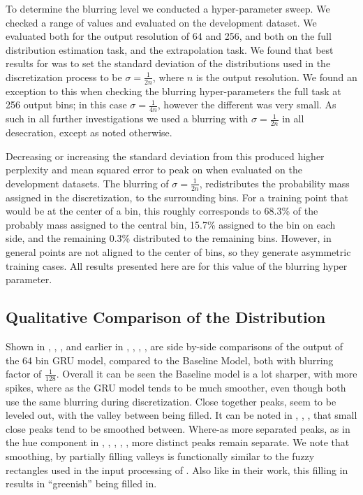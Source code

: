 \documentclass[11pt,letterpaper]{article}
\newcommand{\textcite}{\newcite}
\begin{document}
To determine the blurring level we conducted a hyper-parameter sweep.
We checked a range of values and evaluated on the development dataset.
We evaluated both for the output resolution of 64 and 256, and both on the full distribution estimation task, and the extrapolation task.
We found that best results for was to set the standard deviation of the distributions used in the discretization process to be $\sigma=\frac{1}{2n}$, where $n$ is the output resolution.
We found an exception to this when checking the blurring hyper-parameters the full task at 256 output bins; in this case $\sigma=\frac{1}{4n}$, however the different was very small.
As such in all further investigations we used a blurring with $\sigma=\frac{1}{2n}$ in all desecration, except as noted otherwise.

Decreasing or increasing the standard deviation from this produced higher perplexity and mean squared error to peak on when evaluated on the development datasets.
The blurring of $\sigma=\frac{1}{2n}$, redistributes the probability mass assigned in the discretization, to the surrounding bins.
For a training point that would be at the center of a bin, this roughly corresponds to 68.3\% of the probably mass assigned to the central bin, 15.7\% assigned to the bin on each side, and the remaining 0.3\% distributed to the remaining bins.
However, in general points are not aligned to the center of bins, so they generate asymmetric training cases.
All results presented here are for this value of the blurring hyper parameter.






\subsection{Qualitative Comparison of the Distribution}




Shown in , , , and earlier in , , , ,  are side by-side comparisons of the output of the 64 bin GRU model, compared to the Baseline Model, both with blurring factor of $\frac{1}{128}$.
Overall it can be seen the Baseline model is a lot sharper, with more spikes,
where as the GRU model tends to be much smoother, even though both use the same blurring during discretization.
Close together peaks, seem to be leveled out, with the valley between being filled.
It can be noted in , , , that small close peaks tend to be smoothed between.
Where-as more separated peaks, as in the hue component in , , , , , more distinct peaks remain separate.
We note that smoothing, by partially filling valleys is functionally similar to the fuzzy rectangles used in the input processing of \textcite{mcmahan2015bayesian}.
Also like in their work, this filling in results in ``greenish'' being filled in.
\end{document}

